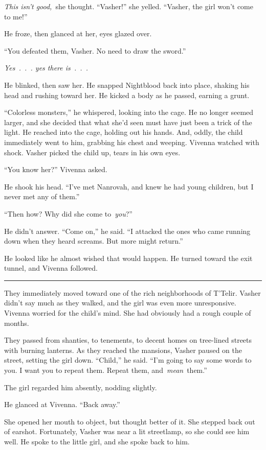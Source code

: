 \textit{This isn’t good,}~she thought. “Vasher!” she yelled. “Vasher, the girl won’t come to me!”

He froze, then glanced at her, eyes glazed over.

“You defeated them, Vasher. No need to draw the sword.”

\textit{Yes~.~.~. yes there is~.~.~.}

He blinked, then saw her. He snapped Nightblood back into place, shaking his head and rushing toward her. He kicked a body as he passed, earning a grunt.

“Colorless monsters,” he whispered, looking into the cage. He no longer seemed larger, and she decided that what she’d seen must have just been a trick of the light. He reached into the cage, holding out his hands. And, oddly, the child immediately went to him, grabbing his chest and weeping. Vivenna watched with shock. Vasher picked the child up, tears in his own eyes.

“You know her?” Vivenna asked.

He shook his head. “I’ve met Nanrovah, and knew he had young children, but I never met any of them.”

“Then how? Why did she come to~\textit{you}?”

He didn’t answer. “Come on,” he said. “I attacked the ones who came running down when they heard screams. But more might return.”

He looked like he almost wished that would happen. He turned toward the exit tunnel, and Vivenna followed.

\bigskip \hrule \bigskip

They immediately moved toward one of the rich neighborhoods of T’Telir. Vasher didn’t say much as they walked, and the girl was even more unresponsive. Vivenna worried for the child’s mind. She had obviously had a rough couple of months.

They passed from shanties, to tenements, to decent homes on tree-lined streets with burning lanterns. As they reached the mansions, Vasher paused on the street, setting the girl down. “Child,” he said. “I’m going to say some words to you. I want you to repeat them. Repeat them, and~\textit{mean}~them.”

The girl regarded him absently, nodding slightly.

He glanced at Vivenna. “Back away.”

She opened her mouth to object, but thought better of it. She stepped back out of earshot. Fortunately, Vasher was near a lit streetlamp, so she could see him well. He spoke to the little girl, and she spoke back to him.

